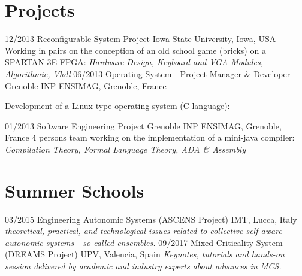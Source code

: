 \documentclass[]{friggeri-cv}
\begin{document}
\section{Projects}
\begin{entrylist}
    \entry
    {12/2013}
    {Reconfigurable System Project}
    {Iowa State University, Iowa, USA}
    {Working in pairs on the conception of an old school game (bricks) on a SPARTAN-3E FPGA:
            \emph{Hardware Design, Keyboard and VGA Modules, Algorithmic, Vhdl}
    }
    \entry
    {06/2013}
    {Operating System - Project Manager \& Developer}
    {Grenoble INP ENSIMAG, Grenoble, France}
    {Development of a Linux type operating system (C language):
        \begin{itemize}
        \end{itemize}
    }
    \entry
    {01/2013}
    {Software Engineering Project}
    {Grenoble INP ENSIMAG, Grenoble, France}
    {4 persons team working on the implementation of a mini-java compiler:
            \emph{Compilation Theory, Formal Language Theory, ADA \& Assembly}
    }
  
\end{entrylist}

\section{Summer Schools}
\begin{entrylist}
  \entry
    {03/2015}
    {Engineering Autonomic Systems (ASCENS Project)}
    {IMT, Lucca, Italy}
    {\emph{theoretical, practical, and technological issues related to collective self-aware autonomic systems - so-called ensembles.}}
  \entry
    {09/2017}
    {Mixed Criticality System (DREAMS Project)}
    {UPV, Valencia, Spain}
    {\emph{Keynotes, tutorials and hands-on session delivered by academic and industry experts about advances in MCS.}}
\end{entrylist}
\end{document}

